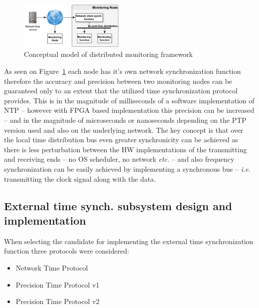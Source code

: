 \documentclass[journal]{IEEEtran}
\begin{document}
\begin{figure}[!htb]
    \centering
    \includegraphics[width=0.45\textwidth]{figures_raw/concept.png}
    \caption{Conceptual model of distributed monitoring framework}
    \label{fig:concept}
\end{figure}

As seen on Figure~\ref{fig:concept} each node has it's own network synchronization function therefore the accuracy and
precision between two monitoring nodes can be guaranteed only to an extent that the utilized time synchronization
protocol provides. This is in the magnitude of milliseconds of a software implementation of NTP -- however with FPGA
based implementation
this precision can be increased --  and in the magnitude of
microseconds or nanoseconds depending on the PTP version used and also on the underlying network.
The key concept is that over the local time distribution bus even greater synchronicity can be achieved as there is
less
perturbation between the HW implementations of the transmitting and receiving ends -- no OS scheduler, no network
\emph{etc.} --
and also frequency synchronization can be easily achieved by implementing a synchronous bus -- \emph{i.e.} transmitting
the
clock signal along with the data.

\subsection{External time synch. subsystem design and implementation}\label{sec:External-Impl}

When selecting the candidate for implementing the external time synchronization function
three protocols were considered:
\begin{itemize}
    \item Network Time Protocol
    \item Precision Time Protocol v1
    \item Precision Time Protocol v2
\end{itemize}
\end{document}

